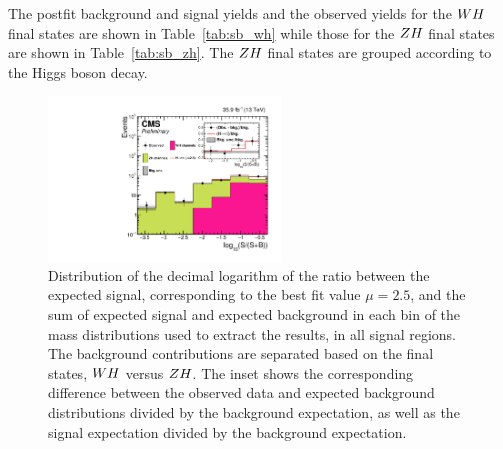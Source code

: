 The postfit background and signal yields and the observed yields for the
$WH$ final states are shown in Table~\ref{tab:sb_wh} while those
for the $ZH$ final states are shown in Table~\ref{tab:sb_zh}. 
The $ZH$ final states are grouped according to the Higgs boson decay.

\begin{figure}[!ht]
 \begin{center}
  \includegraphics[width=0.55\textwidth]{higgs_to_taus_vh/plots/combined/wh_vs_zh_sbweight.pdf}
 \end{center}
 \caption{
 Distribution of the decimal logarithm of the ratio between the expected signal, 
 corresponding to the best fit value $\mu=2.5$, and the 
 sum of expected signal and expected background in each bin of the mass distributions 
 used to extract the results, in all signal regions. The background contributions are 
 separated based on the final states, $WH$ versus $ZH$. The inset 
 shows the corresponding difference between the 
 observed data and expected background distributions divided by the background expectation, 
 as well as the signal expectation divided by the background expectation.
 }
 \label{fig:sb}
\end{figure}

